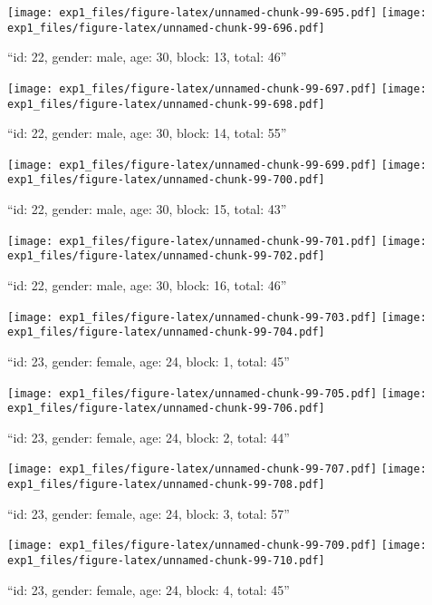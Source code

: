 \documentclass[,]{article}
\begin{document}
\texttt{[image: exp1\_files/figure-latex/unnamed-chunk-99-695.pdf]}
\texttt{[image: exp1\_files/figure-latex/unnamed-chunk-99-696.pdf]}

\newpage
[1] 

``id: 22, gender: male, age: 30, block: 13, total: 46''

\texttt{[image: exp1\_files/figure-latex/unnamed-chunk-99-697.pdf]}
\texttt{[image: exp1\_files/figure-latex/unnamed-chunk-99-698.pdf]}

\newpage
[1] 

``id: 22, gender: male, age: 30, block: 14, total: 55''

\texttt{[image: exp1\_files/figure-latex/unnamed-chunk-99-699.pdf]}
\texttt{[image: exp1\_files/figure-latex/unnamed-chunk-99-700.pdf]}

\newpage
[1] 

``id: 22, gender: male, age: 30, block: 15, total: 43''

\texttt{[image: exp1\_files/figure-latex/unnamed-chunk-99-701.pdf]}
\texttt{[image: exp1\_files/figure-latex/unnamed-chunk-99-702.pdf]}

\newpage
[1] 

``id: 22, gender: male, age: 30, block: 16, total: 46''

\texttt{[image: exp1\_files/figure-latex/unnamed-chunk-99-703.pdf]}
\texttt{[image: exp1\_files/figure-latex/unnamed-chunk-99-704.pdf]}

\newpage
[1] 

``id: 23, gender: female, age: 24, block: 1, total: 45''

\texttt{[image: exp1\_files/figure-latex/unnamed-chunk-99-705.pdf]}
\texttt{[image: exp1\_files/figure-latex/unnamed-chunk-99-706.pdf]}

\newpage
[1] 

``id: 23, gender: female, age: 24, block: 2, total: 44''

\texttt{[image: exp1\_files/figure-latex/unnamed-chunk-99-707.pdf]}
\texttt{[image: exp1\_files/figure-latex/unnamed-chunk-99-708.pdf]}

\newpage
[1] 

``id: 23, gender: female, age: 24, block: 3, total: 57''

\texttt{[image: exp1\_files/figure-latex/unnamed-chunk-99-709.pdf]}
\texttt{[image: exp1\_files/figure-latex/unnamed-chunk-99-710.pdf]}

\newpage
[1] 

``id: 23, gender: female, age: 24, block: 4, total: 45''
\end{document}
